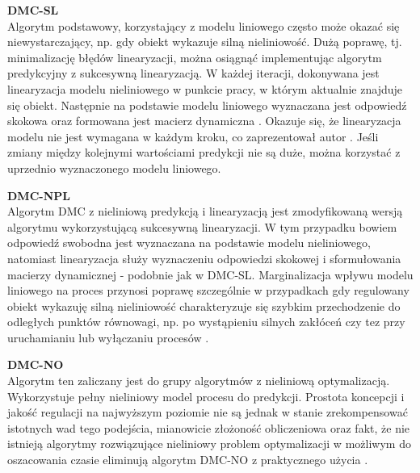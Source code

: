 \begin{description}
\item \textbf{DMC-SL} \\
Algorytm podstawowy, korzystający z modelu liniowego często może okazać się niewystarczający, np. gdy obiekt wykazuje silną nieliniowość. Dużą poprawę, tj. minimalizację błędów linearyzacji, można osiągnąć implementując algorytm predykcyjny z sukcesywną linearyzacją. W każdej iteracji, dokonywana jest linearyzacja modelu nieliniowego w punkcie pracy, w którym aktualnie znajduje się obiekt. Następnie na podstawie modelu liniowego wyznaczana jest odpowiedź skokowa oraz formowana jest macierz dynamiczna \cite{170, 120}. Okazuje się, że linearyzacja modelu nie jest wymagana w każdym kroku, co zaprezentował autor \cite{30}. Jeśli zmiany między kolejnymi wartościami predykcji nie są duże, można korzystać z uprzednio wyznaczonego modelu liniowego.

\item \textbf{DMC-NPL} \\
Algorytm DMC z nieliniową predykcją i linearyzacją jest zmodyfikowaną wersją algorytmu wykorzystującą sukcesywną linearyzacji. W tym przypadku bowiem odpowiedź swobodna jest wyznaczana na podstawie modelu nieliniowego, natomiast linearyzacja służy wyznaczeniu odpowiedzi skokowej i sformułowania macierzy dynamicznej - podobnie jak w DMC-SL. Marginalizacja wpływu modelu liniowego na proces przynosi poprawę szczególnie w przypadkach gdy regulowany obiekt wykazuję silną nieliniowość charakteryzuje się szybkim przechodzenie do odległych punktów równowagi, np. po wystąpieniu silnych zakłóceń czy tez przy uruchamianiu lub wyłączaniu procesów \cite{170, 120}.

\item \textbf{DMC-NO} \\
Algorytm ten zaliczany jest do grupy algorytmów z nieliniową optymalizacją. Wykorzystuje pełny nieliniowy model procesu do predykcji. Prostota koncepcji i jakość regulacji na najwyższym poziomie nie są jednak w stanie zrekompensować istotnych wad tego podejścia, mianowicie złożoność obliczeniowa oraz fakt, że nie istnieją algorytmy rozwiązujące nieliniowy problem optymalizacji w możliwym do oszacowania czasie eliminują algorytm DMC-NO z praktycznego użycia \cite{170}.
\end{description}